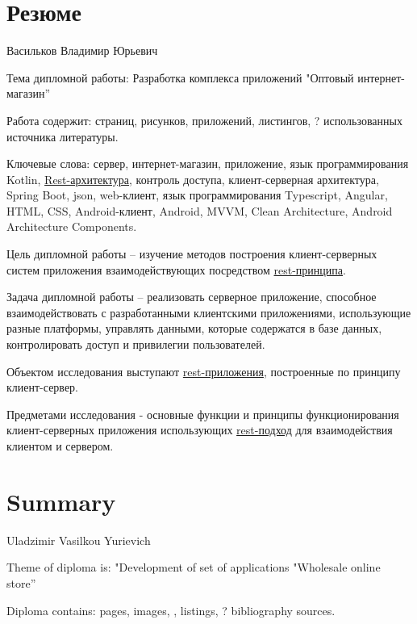 \pagestyle{empty}
\section*{Резюме}\label{sec:cw-ru}\indent

Васильков Владимир Юрьевич

Тема дипломной работы: Разработка комплекса приложений "Оптовый интернет-магазин”

Работа содержит: \pageref{LastPage} страниц,  рисунков,  приложений,  листингов, ? использованных источника литературы.

Ключевые слова: сервер, интернет-магазин, приложение, язык программирования Kotlin, \hyperlink{gloss:rest}{Rest-архитектура}, контроль доступа, клиент-серверная архитектура, Spring Boot, json, web-клиент, язык программирования Typescript, Angular, HTML, CSS, Android-клиент, Android, MVVM, Clean Architecture, Android Architecture Components.

Цель дипломной работы – изучение методов построения клиент-серверных систем приложения взаимодействующих посредством \hyperlink{gloss:rest}{rest-принципа}.

Задача дипломной работы – реализовать серверное приложение, способное взаимодействовать с разработанными клиентскими приложениями, использующие разные платформы, управлять данными, которые содержатся в базе данных, контролировать доступ и привилегии пользователей.

Объектом исследования выступают \hyperlink{gloss:rest}{rest-приложения}, построенные по принципу клиент-сервер.

Предметами исследования - основные функции и принципы функционирования клиент-серверных приложения использующих \hyperlink{gloss:rest}{rest-подход} для взаимодействия клиентом и сервером.

\section*{Summary}\label{sec:cw-eng}\indent
{}

Uladzimir Vasilkou Yurievich

Theme of diploma is: "Development of set of applications "Wholesale online store”

Diploma contains: \pageref{LastPage} pages,  images, ,  listings, ? bibliography sources.

